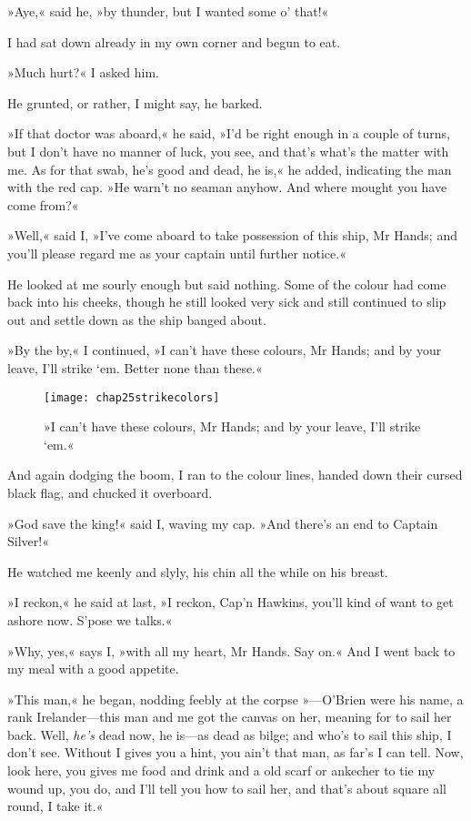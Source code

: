 »Aye,« said he, »by thunder, but I wanted some o' that!«

I had sat down already in my own corner and begun to eat.

»Much hurt?« I asked him.

He grunted, or rather, I might say, he barked.

»If that doctor was aboard,« he said, »I'd be right enough in a couple of turns, but I don't have no manner of luck, you see, and that's what's the matter with me. As for that swab, he's good and dead, he is,« he added, indicating the man with the red cap. »He warn't no seaman anyhow. And where mought you have come from?«

»Well,« said I, »I've come aboard to take possession of this ship, Mr Hands; and you'll please regard me as your captain until further notice.«

He looked at me sourly enough but said nothing. Some of the colour had come back into his cheeks, though he still looked very sick and still continued to slip out and settle down as the ship banged about.

»By the by,« I continued, »I can't have these colours, Mr Hands; and by your leave, I'll strike `em. Better none than these.«

    \begin{figure}[p]
\centering
\texttt{[image: chap25strikecolors]}
\caption[»I can't have these colours, Mr Hands«]{»I can't have these colours, Mr Hands; and by your leave, I'll strike `em.«}
\end{figure}   

And again dodging the boom, I ran to the colour lines, handed down their cursed black flag, and chucked it overboard.

»God save the king!« said I, waving my cap. »And there's an end to Captain Silver!«

He watched me keenly and slyly, his chin all the while on his breast.

»I reckon,« he said at last, »I reckon, Cap'n Hawkins, you'll kind of want to get ashore now. S'pose we talks.«

»Why, yes,« says I, »with all my heart, Mr Hands. Say on.« And I went back to my meal with a good appetite.

»This man,« he began, nodding feebly at the corpse »—O'Brien were his name, a rank Irelander—this man and me got the canvas on her, meaning for to sail her back. Well, \textit{he's} dead now, he is—as dead as bilge; and who's to sail this ship, I don't see. Without I gives you a hint, you ain't that man, as far's I can tell. Now, look here, you gives me food and drink and a old scarf or ankecher to tie my wound up, you do, and I'll tell you how to sail her, and that's about square all round, I take it.«

